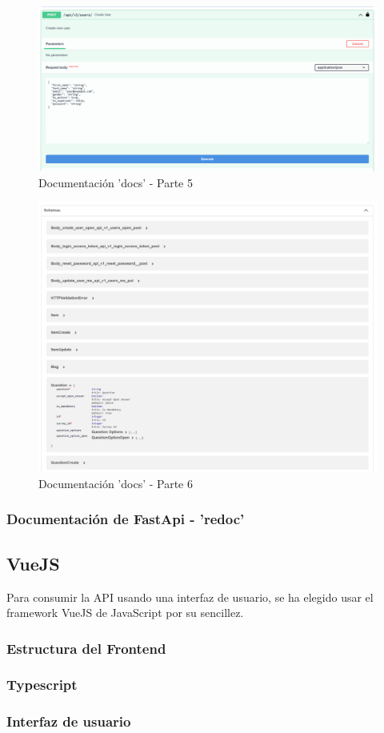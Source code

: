 \begin{figure}[!htb]
    \centering
    \includegraphics[scale=.10]{TT/img/implementacion/docs_5.png}
    \caption{Documentación 'docs' - Parte 5}
    \label{graphic:docs5}
\end{figure}

\begin{figure}[!htb]
    \centering
    \includegraphics[scale=.10]{TT/img/implementacion/docs_6.png}
    \caption{Documentación 'docs' - Parte 6}
    \label{graphic:docs6}
\end{figure}

\subsubsection{Documentación de FastApi - 'redoc'}
\subsection{VueJS}
Para consumir la API usando una interfaz de usuario, se ha elegido usar el framework VueJS de JavaScript por su sencillez.
\subsubsection{Estructura del Frontend}
\subsubsection{Typescript}
\subsubsection{Interfaz de usuario}

